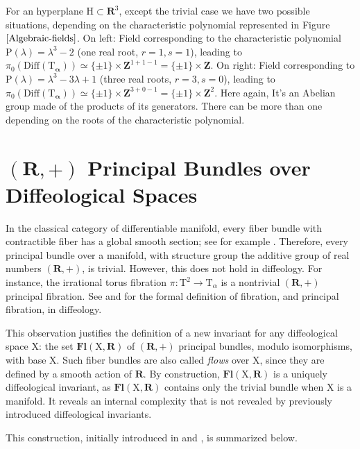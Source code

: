 \documentclass[10pt,letterpaper,reqno]{amsart}
\theoremstyle{article}
\newcommand{\1}{{\hat 1}}
\newcommand{\0}{{\hat 0}}
\newcommand{\RR}{\mathbf R}
\newcommand{\ZZ}{\mathbf Z}
\newcommand{\balpha}{{\pmb{\alpha}}}
\def \H{\mathrm H}
\def \P{\mathrm P}
\def \T{\mathrm T}
\def \X{\mathrm X}
\newcommand{\Diff}{\mathrm{Diff}}
\DeclareMathOperator{\Fb}{\boldsymbol{\mathsf{Fl}}}
\renewcommand{\Fb}{\mathbf{Fl}}
\def \H{\mathrm H}
\begin{document}
  For an hyperplane $\H \subset \RR^3$,
  except the trivial case we have two possible situations,
  depending on the characteristic polynomial represented in Figure $\ref{Algebraic-fields}$.
  On left: Field corresponding to the characteristic polynomial $\P(\lambda) = \lambda^3-2$ (one real root, $r=1, s=1$),
  leading to $\pi_0(\Diff(\T_\balpha)) \simeq \{\pm 1\} \times \ZZ^{1+1-1} = \{\pm 1\} \times \ZZ$.
  On right: Field corresponding to $\P(\lambda) = \lambda^3-3\lambda+1$ (three real roots, $r=3, s=0$),
  leading to $\pi_0(\Diff(\T_\balpha)) \simeq \{\pm 1\} \times \ZZ^{3+0-1} = \{\pm 1\} \times \ZZ^2$.
  Here again,
  It's an Abelian group made of the products of its generators.
  There can be more than one depending on the roots of the characteristic polynomial.
  
  
  \section{$(\RR,+)$ Principal Bundles over Diffeological Spaces}
  \label{R-bundles-over-diffeological-spaces}
  In the classical category of differentiable manifold,
  every fiber bundle with contractible fiber has a global smooth section;
  see for example \cite{Hus94}.
  Therefore,
  every principal bundle over a manifold,
  with structure group the additive group of real numbers $(\RR,+)$, is trivial.
  However,
  this does not hold in diffeology.
  For instance,
  the irrational torus fibration $\pi : \T^2 \to \T_\alpha$ is a nontrivial $(\RR,+)$ principal fibration.
  See \cite{PIZ85} and \cite[]{PIZ13} for the formal definition of fibration,
  and principal fibration,
  in diffeology.
  
  This observation justifies the definition of a new invariant for any diffeological space $\X$:
  the set $\Fb(\X,\RR)$ of $(\RR,+)$ principal bundles,
  modulo isomorphisms,
  with base $\X$.
  Such fiber bundles are also called {\em flows} over $\X$,
  since they are defined by a smooth action of $\RR$.
  By construction,
  $\Fb(\X,\RR)$ is a uniquely diffeological invariant,
  as $\Fb(\X,\RR)$ contains only the trivial bundle when $\X$ is a manifold.
  It reveals an internal complexity that is not revealed by previously introduced diffeological invariants.
  
  This construction,
  initially introduced in \cite{PIZ85} and \cite{PIZ86},
  is summarized below.
  
\end{document}
